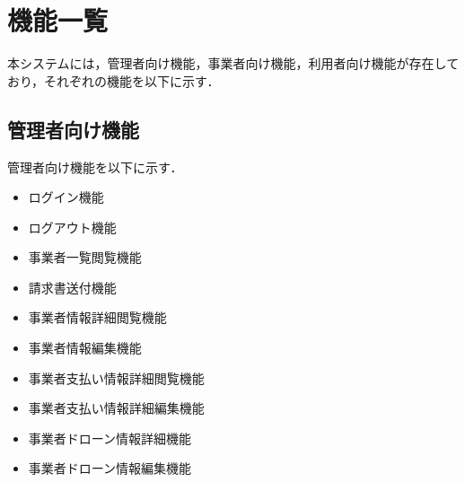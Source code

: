 \documentclass[a4paper, titlepage]{jsarticle}
\begin{document}
\section{機能一覧}
本システムには，管理者向け機能，事業者向け機能，利用者向け機能が存在しており，それぞれの機能を以下に示す．

\subsection{管理者向け機能}
管理者向け機能を以下に示す．
\begin{itemize}[labelwidth=\linewidth]
  \setlength{\leftskip}{1em}

  \item ログイン機能 %
  \item ログアウト機能 %

  \item 事業者一覧閲覧機能 %
  \item 請求書送付機能 %
  \item 事業者情報詳細閲覧機能 %
  \item 事業者情報編集機能 %
  \item 事業者支払い情報詳細閲覧機能 %
  \item 事業者支払い情報詳細編集機能 %
  \item 事業者ドローン情報詳細機能 %
  \item 事業者ドローン情報編集機能 %


\end{itemize}
\end{document}
